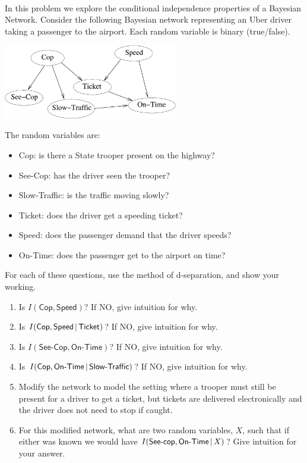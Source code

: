\documentclass[submit]{harvardml}
\newcommand{\attr}[1]{\textsf{#1}}
\begin{document}
\begin{problem}
  ~

  \noindent In this problem we explore the conditional independence
  properties of a Bayesian Network.
Consider the following Bayesian network 
representing an Uber driver taking a passenger
to the airport. 
Each random variable is
  binary (true/false).
\begin{center}
\includegraphics[width=3in]{speeding.pdf}
\end{center}
  
The random variables are:
%
\begin{itemize}
\item \attr{Cop}: is there a State trooper present on the highway?
\item \attr{See-Cop}: has the driver seen the trooper?
\item \attr{Slow-Traffic}: is the traffic moving slowly?
\item \attr{Ticket}: does the driver get a speeding ticket?
\item \attr{Speed}: does the passenger demand that the driver speeds?
\item \attr{On-Time}: does the passenger get to the airport on time?
\end{itemize}

\medskip
 
For each of these questions, use the method of d-separation, and show
your working. 
%
\begin{enumerate}
\item Is $I(\attr{Cop},\attr{Speed})$? If NO, give
intuition for why.
%
%
\item Is $I(\attr{Cop},\attr{Speed}\given \attr{Ticket})$? If NO, give
intuition for why.
%
%
\item Is $I(\attr{See-Cop},\attr{On-Time})$? If NO, give
intuition for why.
%
\item Is $I(\attr{Cop},\attr{On-Time}\given \attr{Slow-Traffic})$? If NO, give intuition for why.
%
\item Modify the network to model the 
setting where 
a trooper must still be present for a driver to get a ticket, but
tickets are delivered electronically and the driver does not need to
stop if caught.
%
%
\item For this modified network, what are 
two random variables, $X$, 
such that if either was known we would 
have $I(\attr{See-cop},\attr{On-Time}\given
X)$? Give intuition for your answer.
%
\end{enumerate}
\end{problem}
\end{document}
